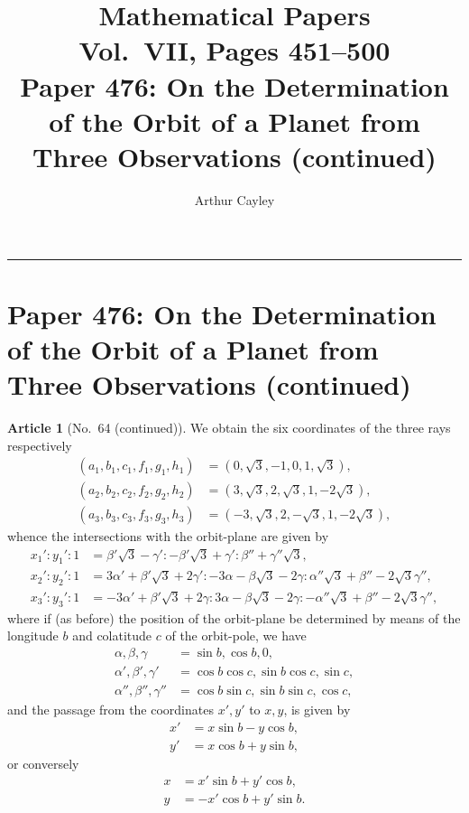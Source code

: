 \documentclass[11pt,a4paper]{article}
\title{\textbf{Mathematical Papers}\\[.5em]
\large Vol.\ VII, Pages 451--500\\[.3em]
\normalsize Paper 476: On the Determination of the Orbit of a Planet from Three Observations (continued)}
\author{Arthur Cayley}
\date{}
\theoremstyle{definition}
\newtheorem{art}{Article}
\begin{document}
\maketitle
\thispagestyle{fancy}

\noindent\rule{\textwidth}{0.5pt}

\section*{Paper 476: On the Determination of the Orbit of a Planet from Three Observations (continued)}

\begin{art}[No.~64 (continued)]
We obtain the six coordinates of the three rays respectively
\begin{align*}
(a_1, b_1, c_1, f_1, g_1, h_1) &= (0, \surd 3, -1, 0, 1, \surd 3),\\
(a_2, b_2, c_2, f_2, g_2, h_2) &= (3, \surd 3, 2, \surd 3, 1, -2\surd 3),\\
(a_3, b_3, c_3, f_3, g_3, h_3) &= (-3, \surd 3, 2, -\surd 3, 1, -2\surd 3),
\end{align*}
whence the intersections with the orbit-plane are given by
\begin{align*}
x_1' : y_1' : 1 &= \beta'\surd 3 - \gamma' : -\beta'\surd 3 + \gamma' : \beta'' + \gamma''\surd 3,\\
x_2' : y_2' : 1 &= 3\alpha' + \beta'\surd 3 + 2\gamma' : -3\alpha - \beta\surd 3 - 2\gamma : \alpha''\surd 3 + \beta'' - 2\surd 3\gamma'',\\
x_3' : y_3' : 1 &= -3\alpha' + \beta'\surd 3 + 2\gamma : 3\alpha - \beta\surd 3 - 2\gamma : -\alpha''\surd 3 + \beta'' - 2\surd 3\gamma'',
\end{align*}
where if (as before) the position of the orbit-plane be determined by means of the longitude $b$ and colatitude $c$ of the orbit-pole, we have
\begin{align*}
\alpha, \beta, \gamma &= \sin b, \cos b, 0,\\
\alpha', \beta', \gamma' &= \cos b \cos c, \sin b \cos c, \sin c,\\
\alpha'', \beta'', \gamma'' &= \cos b \sin c, \sin b \sin c, \cos c,
\end{align*}
and the passage from the coordinates $x', y'$ to $x, y$, is given by
\begin{align*}
x' &= x \sin b - y \cos b,\\
y' &= x \cos b + y \sin b,
\end{align*}
or conversely
\begin{align*}
x &= x' \sin b + y' \cos b,\\
y &= -x' \cos b + y' \sin b.
\end{align*}
\end{art}
\end{document}

